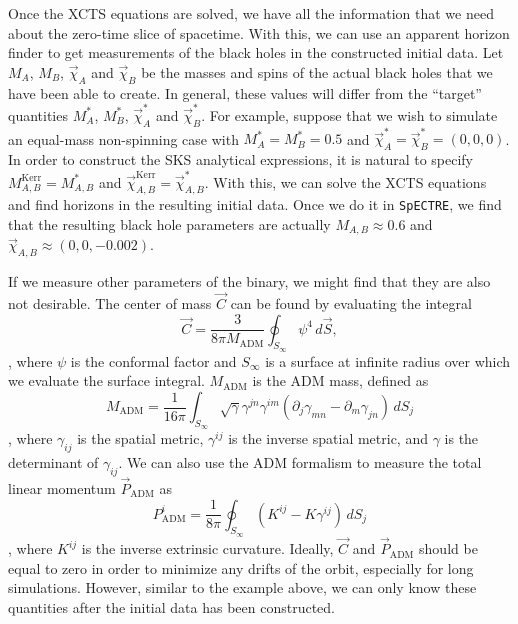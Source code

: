 \documentclass{../document}
\begin{document}
  Once the XCTS equations are solved, we have all the information that we need about the zero-time slice of spacetime. With this, we can use an apparent horizon finder to get measurements of the black holes in the constructed initial data. Let $M_A$, $M_B$, $\vec\chi_{A}$ and $\vec\chi_{B}$ be the masses and spins of the actual black holes that we have been able to create. In general, these values will differ from the ``target'' quantities $M^*_A$, $M^*_B$, $\vec\chi^*_{A}$ and $\vec\chi^*_{B}$. For example, suppose that we wish to simulate an equal-mass non-spinning case with $M^*_A = M^*_B = 0.5$ and $\vec\chi^*_{A} = \vec\chi^*_{B} = (0,0,0)$. In order to construct the SKS analytical expressions, it is natural to specify $M^\text{Kerr}_{A,B} = M^*_{A,B}$ and $\vec\chi^\text{Kerr}_{A,B} = \vec\chi^*_{A,B}$. With this, we can solve the XCTS equations and find horizons in the resulting initial data. Once we do it in {\tt SpECTRE}, we find that the resulting black hole parameters are actually $M_{A,B} \approx 0.6$ and $\vec\chi_{A,B} \approx (0,0,-0.002)$.

  If we measure other parameters of the binary, we might find that they are also not desirable. The center of mass $\vec C$ can be found by evaluating the integral
  \begin{equation} \label{eq:CoM}
    \vec C = \frac{3}{8 \pi M_\text{ADM}} \oint_{S_\infty} \psi^4 \, d\vec S,
  \end{equation}
  \cite{Serguei}, where $\psi$ is the conformal factor and $S_\infty$ is a surface at infinite radius over which we evaluate the surface integral. $M_\text{ADM}$ is the ADM mass, defined as
  \begin{equation} \label{eq:Madm}
    M_\text{ADM} = \frac{1}{16 \pi} \int_{S_\infty} \sqrt{\gamma} \gamma^{jn} \gamma^{im} (\partial_j \gamma_{mn} - \partial_m \gamma_{jn}) \, dS_j
  \end{equation}
  \cite{BaumgarteShapiro}, where $\gamma_{ij}$ is the spatial metric, $\gamma^{ij}$ is the inverse spatial metric, and $\gamma$ is the determinant of $\gamma_{ij}$. We can also use the ADM formalism to measure the total linear momentum $\vec P_\text{ADM}$ as
  \begin{equation} \label{eq:Padm}
    P_\text{ADM}^i = \frac{1}{8\pi} \oint_{S_\infty} (K^{ij} - K \gamma^{ij}) \, dS_j
  \end{equation}
  \cite{Serguei}, where $K^{ij}$ is the inverse extrinsic curvature. Ideally, $\vec C$ and $\vec P_\text{ADM}$ should be equal to zero in order to minimize any drifts of the orbit, especially for long simulations. However, similar to the example above, we can only know these quantities after the initial data has been constructed.
  
\end{document}
